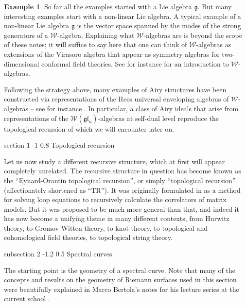 \documentclass[reqno,oneside,11pt]{amsart}
\makeatletter
\theoremstyle{plain}
\theoremstyle{definition}
\newtheorem{example}[theorem]{Example}
\theoremstyle{remark}
\numberwithin{equation}{section}
\renewcommand{\section}{\@startsection
{section}%
{1}%
{\z@}%
{-1\baselineskip}%
{0.8\baselineskip}%
{\centering\scshape\large}} %
\renewcommand{\subsection}{\@startsection
{subsection}%
{2}%
{\z@}%
{-1.2\baselineskip}%
{0.5\baselineskip}%
{\normalfont \bf \normalsize}} %
\makeatother
\begin{document}
\begin{example}
So far all the examples started with a Lie algebra $\mathfrak{g}$. But many interesting examples start with a non-linear Lie algebra. A typical example of a non-linear Lie algebra $\mathfrak{g}$ is the vector space spanned by the modes of the strong generators of a $\mathcal{W}$-algebra. Explaining what $\mathcal{W}$-algebras are is beyond the scope of these notes; it will suffice to say here that one can think of $\mathcal{W}$-algebras as extensions of the Virasoro algebra that appear as symmetry algebras for two-dimensional conformal field theories. See for instance \cite{Ar16} for an introduction to $\mathcal{W}$-algebras.

Following the strategy above, many examples of Airy structures have been constructed via representations of the Rees universal enveloping algebras of $\mathcal{W}$-algebras -- see for instance \cite{BBCCN18, BKS20,BM20, BBCC21,  BCJ22,BCU24}. In particular, a class of Airy ideals that arise from representations of the $\mathcal{W}(\mathfrak{gl}_n)$-algebras at self-dual level reproduce the topological recursion of \cite{BE13} which we will encounter later on.
\end{example}


\section{Topological recursion}

\label{s:TR}

Let us now study a different recursive structure, which at first will appear completely unrelated. The recursive structure in question has become known as the ``Eynard-Orantin topological recursion'', or simply ``topological recursion'' (affectionately shortened as ``TR''). It was originally formulated in \cite{EO07} as a method for solving loop equations to recursively calculate the correlators of matrix models. But it was proposed to be much more general than that, and indeed it has now become a unifying theme in many different contexts, from Hurwitz theory, to Gromov-Witten theory, to knot theory, to topological and cohomological field theories, to topological string theory. 

\subsection{Spectral curves}

The starting point is the geometry of a spectral curve. Note that many of the concepts and results on the geometry of Riemann surfaces used in this section were beautifully explained in Marco Bertola's notes for his lecture series at the current school \cite{Be24}.
\end{document}
